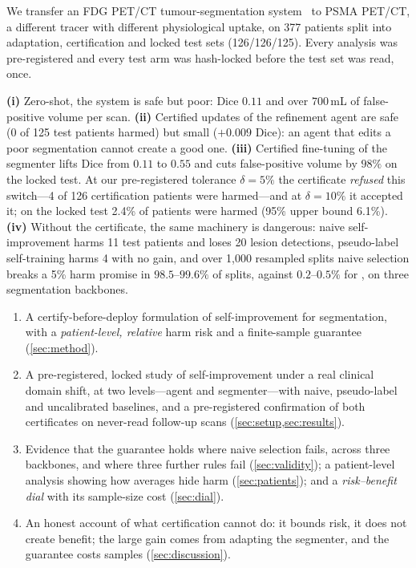  We transfer an FDG PET/CT tumour-segmentation system~\cite{gatidis2022autopet} to PSMA PET/CT, a different tracer with different physiological uptake, on 377 patients split into adaptation, certification and locked test sets (126/126/125).
Every analysis was pre-registered and every test arm was hash-locked before the test set was read, once.

\textbf{(i)} Zero-shot, the system is safe but poor: Dice $0.11$ and over $700$\,mL of false-positive volume per scan.
\textbf{(ii)} Certified updates of the refinement agent are safe (0 of 125 test patients harmed) but small ($+0.009$ Dice): an agent that edits a poor segmentation cannot create a good one.
\textbf{(iii)} Certified fine-tuning of the segmenter lifts Dice from $0.11$ to $0.55$ and cuts false-positive volume by $98\%$ on the locked test.
At our pre-registered tolerance $\delta=5\%$ the certificate \emph{refused} this switch---4 of 126 certification patients were harmed---and at $\delta=10\%$ it accepted it; on the locked test 2.4\% of patients were harmed (95\% upper bound 6.1\%).
\textbf{(iv)} Without the certificate, the same machinery is dangerous: naive self-improvement harms 11 test patients and loses 20 lesion detections, pseudo-label self-training harms 4 with no gain, and over 1,000 resampled splits naive selection breaks a 5\% harm promise in $98.5$--$99.6\%$ of splits, against $0.2$--$0.5\%$ for \ours, on three segmentation backbones.

\begin{enumerate}[nosep,leftmargin=*]
\item A certify-before-deploy formulation of self-improvement for segmentation, with a \emph{patient-level, relative} harm risk and a finite-sample guarantee (\cref{sec:method}).
\item A pre-registered, locked study of self-improvement under a real clinical domain shift, at two levels---agent and segmenter---with naive, pseudo-label and uncalibrated baselines, and a pre-registered confirmation of both certificates on never-read follow-up scans (\cref{sec:setup,sec:results}).
\item Evidence that the guarantee holds where naive selection fails, across three backbones, and where three further rules fail (\cref{sec:validity}); a patient-level analysis showing how averages hide harm (\cref{sec:patients}); and a \emph{risk--benefit dial} with its sample-size cost (\cref{sec:dial}).
\item An honest account of what certification cannot do: it bounds risk, it does not create benefit; the large gain comes from adapting the segmenter, and the guarantee costs samples (\cref{sec:discussion}).
\end{enumerate}

